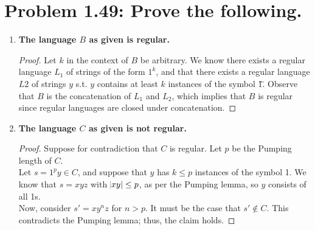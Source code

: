 \documentclass[12pt]{article}
\begin{document}
\section*{Problem 1.49: Prove the following.}
\begin{enumerate}[label=(\alph*)]
\item \textbf{The language $B$ as given is regular.}
  \begin{proof}
    Let $k$ in the context of $B$ be arbitrary. We know there exists a regular language $L_{1}$ of strings of the form $1^{k}$, and that there exists a regular language $L{2}$ of strings $y$ s.t. $y$ contains at least $k$ instances of the symbol \"1\". Observe that $B$ is the concatenation of $L_{1}$ and $L_{2}$, which implies that $B$ is regular since regular languages are closed under concatenation.
  \end{proof}
\item \textbf{The language $C$ as given is not regular.}
  \begin{proof}
    Suppose for contradiction that $C$ is regular. Let $p$ be the Pumping length of $C$. \\
    \newline
    Let $s = 1^{p}y \in C$, and suppose that $y$ has $k \leq p$ instances of the symbol 1. We know that $s = xyz$ with $\abs{xy} \leq p$, as per the Pumping lemma, so $y$ consists of all 1s. \\
    \newline
    Now, consider $s' = xy^{n}z$ for $n > p$. It must be the case that $s' \notin C$. This contradicts the Pumping lemma; thus, the claim holds.
  \end{proof}
\end{enumerate}
\end{document}
